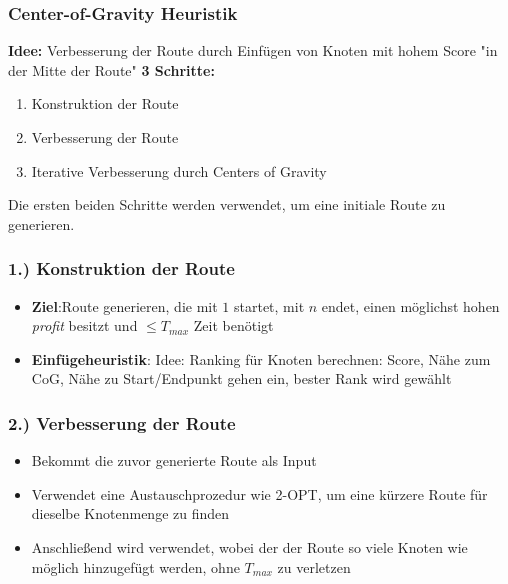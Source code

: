 \documentclass{beamer}
\begin{document}
\begin{frame}
  \frametitle{Center-of-Gravity Heuristik}
  \textbf{Idee:}
  Verbesserung der Route durch Einfügen von Knoten mit hohem Score "in der Mitte der Route"\newline
  \textbf{3 Schritte:}
  \begin{enumerate}
    \item Konstruktion der Route
    \item Verbesserung der Route
    \item Iterative Verbesserung durch Centers of Gravity
  \end{enumerate}
  Die ersten beiden Schritte werden verwendet, um eine initiale Route zu generieren.
\end{frame}

\begin{frame}
  \frametitle{1.) Konstruktion der Route}
  \begin{itemize}
    \item \textbf{Ziel}:\newline Route generieren, die mit $1$ startet, mit $n$ endet, einen möglichst hohen \textit{profit} besitzt
    und $\leq T_{max}$ Zeit benötigt
    \item \textbf{Einfügeheuristik}:\newline
      Idee: Ranking für Knoten berechnen: Score, Nähe zum CoG, Nähe zu Start/Endpunkt gehen ein, bester Rank wird gewählt
  \end{itemize}
\end{frame}

\begin{frame}
  \frametitle{2.) Verbesserung der Route}
  \begin{itemize}
    \item Bekommt die zuvor generierte Route als Input
    \item Verwendet eine Austauschprozedur wie \textsc{2-OPT}, um eine kürzere Route für dieselbe Knotenmenge zu finden
    \item Anschließend wird  verwendet, wobei der der Route so viele Knoten wie möglich hinzugefügt werden,
    ohne $T_{max}$ zu verletzen
  \end{itemize}
\end{frame}
\end{document}
